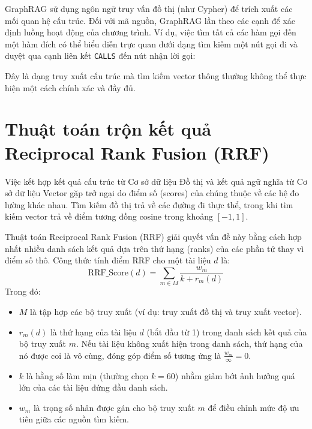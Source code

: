 \documentclass[12pt,a4paper,oneside]{report}
\begin{document}
GraphRAG sử dụng ngôn ngữ truy vấn đồ thị (như Cypher) để trích xuất các mối quan hệ cấu trúc. Đối với mã nguồn, GraphRAG lần theo các cạnh để xác định luồng hoạt động của chương trình. Ví dụ, việc tìm tất cả các hàm gọi đến một hàm đích có thể biểu diễn trực quan dưới dạng tìm kiếm một nút gọi đi và duyệt qua cạnh liên kết \texttt{CALLS} đến nút nhận lời gọi:
\begin{center}
\end{center}
Đây là dạng truy xuất cấu trúc mà tìm kiếm vector thông thường không thể thực hiện một cách chính xác và đầy đủ.

\section{Thuật toán trộn kết quả Reciprocal Rank Fusion (RRF)}
Việc kết hợp kết quả cấu trúc từ Cơ sở dữ liệu Đồ thị và kết quả ngữ nghĩa từ Cơ sở dữ liệu Vector gặp trở ngại do điểm số (scores) của chúng thuộc về các hệ đo lường khác nhau. Tìm kiếm đồ thị trả về các đường đi thực thể, trong khi tìm kiếm vector trả về điểm tương đồng cosine trong khoảng $[-1, 1]$.

Thuật toán Reciprocal Rank Fusion (RRF) giải quyết vấn đề này bằng cách hợp nhất nhiều danh sách kết quả dựa trên thứ hạng (ranks) của các phần tử thay vì điểm số thô. Công thức tính điểm RRF cho một tài liệu $d$ là:
\begin{equation}
    \text{RRF\_Score}(d) = \sum_{m \in M} \frac{w_m}{k + r_m(d)}
\end{equation}
Trong đó:
\begin{itemize}
    \item $M$ là tập hợp các bộ truy xuất (ví dụ: truy xuất đồ thị và truy xuất vector).
    \item $r_m(d)$ là thứ hạng của tài liệu $d$ (bắt đầu từ 1) trong danh sách kết quả của bộ truy xuất $m$. Nếu tài liệu không xuất hiện trong danh sách, thứ hạng của nó được coi là vô cùng, đóng góp điểm số tương ứng là $\frac{w_m}{\infty} = 0$.
    \item $k$ là hằng số làm mịn (thường chọn $k=60$) nhằm giảm bớt ảnh hưởng quá lớn của các tài liệu đứng đầu danh sách.
    \item $w_m$ là trọng số nhân được gán cho bộ truy xuất $m$ để điều chỉnh mức độ ưu tiên giữa các nguồn tìm kiếm.
\end{itemize}
\end{document}

